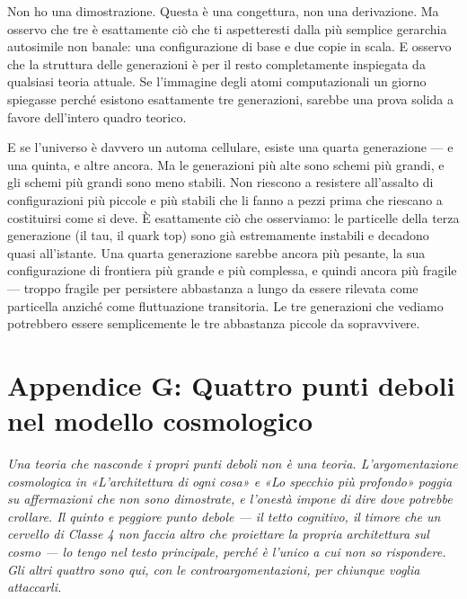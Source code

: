 \documentclass[11pt, twoside, openright]{book}
\begin{document}
Non ho una dimostrazione. Questa è una congettura, non una derivazione. Ma osservo che tre è esattamente ciò che ti aspetteresti dalla più semplice gerarchia autosimile non banale: una configurazione di base e due copie in scala. E osservo che la struttura delle generazioni è per il resto completamente inspiegata da qualsiasi teoria attuale. Se l'immagine degli atomi computazionali un giorno spiegasse perché esistono esattamente tre generazioni, sarebbe una prova solida a favore dell'intero quadro teorico.

E se l'universo è davvero un automa cellulare, esiste una quarta generazione --- e una quinta, e altre ancora. Ma le generazioni più alte sono schemi più grandi, e gli schemi più grandi sono meno stabili. Non riescono a resistere all'assalto di configurazioni più piccole e più stabili che li fanno a pezzi prima che riescano a costituirsi come si deve. È esattamente ciò che osserviamo: le particelle della terza generazione (il tau, il quark top) sono già estremamente instabili e decadono quasi all'istante. Una quarta generazione sarebbe ancora più pesante, la sua configurazione di frontiera più grande e più complessa, e quindi ancora più fragile --- troppo fragile per persistere abbastanza a lungo da essere rilevata come particella anziché come fluttuazione transitoria. Le tre generazioni che vediamo potrebbero essere semplicemente le tre abbastanza piccole da sopravvivere.


\chapter*{Appendice G: Quattro punti deboli nel modello cosmologico}

\textit{Una teoria che nasconde i propri punti deboli non è una teoria. L'argomentazione cosmologica in «L'architettura di ogni cosa» e «Lo specchio più profondo» poggia su affermazioni che non sono dimostrate, e l'onestà impone di dire dove potrebbe crollare. Il quinto e peggiore punto debole --- il tetto cognitivo, il timore che un cervello di Classe 4 non faccia altro che proiettare la propria architettura sul cosmo --- lo tengo nel testo principale, perché è l'unico a cui non so rispondere. Gli altri quattro sono qui, con le controargomentazioni, per chiunque voglia attaccarli.}
\end{document}
